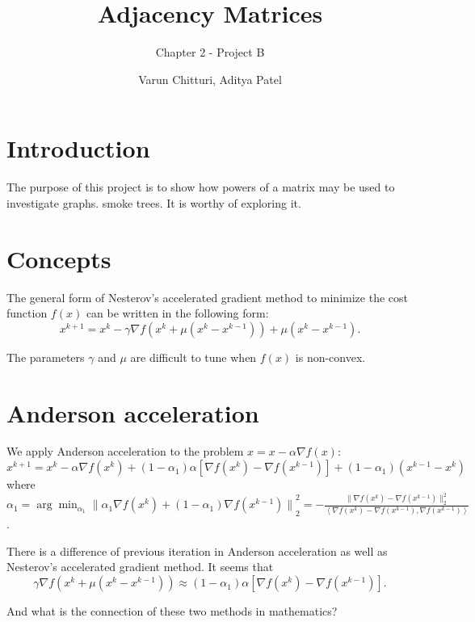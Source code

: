\documentclass{article}
\title{Adjacency Matrices}
\author{Chapter 2 - Project B}
\date{Varun Chitturi, Aditya Patel}
\begin{document}
\maketitle

\section{Introduction}
The purpose of this project is to show how powers of a matrix may be used to investigate graphs.
smoke trees.
\newline\newline
It is worthy of exploring it.
\section{Concepts}
The general form of Nesterov's accelerated gradient method to minimize the cost function $f(x)$ can be written in the following form:
$$x^{k+1}=x^k-\gamma \nabla f(x^k+\mu(x^k-x^{k-1}))+\mu(x^k-x^{k-1}).$$

The parameters $\gamma$ and $\mu$ are difficult to tune when $f(x)$ is non-convex.
\section{Anderson acceleration}
We apply Anderson acceleration to the problem $x=x-\alpha\nabla f(x)$:
$$x^{k+1}=x^k-\alpha \nabla f(x^k)+(1-\alpha_1)\alpha[\nabla f(x^k)-\nabla f(x^{k-1})]+(1-\alpha_1)(x^{k-1}-x^k)$$
where $\alpha_1=\arg\min_{\alpha_1}{\|\alpha_1\nabla f(x^k)+(1-\alpha_1) \nabla f(x^{k-1})\|}_2^2=-\frac{\|\nabla f(x^k)-\nabla f(x^{k-1})\|_2^2}{\left<\nabla f(x^k)-\nabla f(x^{k-1}), \nabla f(x^{k-1})\right>}$.

There is a difference of previous iteration in Anderson acceleration as well as Nesterov's accelerated gradient method.
It seems that 
$$\gamma \nabla f(x^k+\mu(x^k-x^{k-1}))\approx (1-\alpha_1)\alpha[\nabla f(x^k)-\nabla f(x^{k-1})].$$

And what is the connection of these two methods in mathematics?
\end{document}
